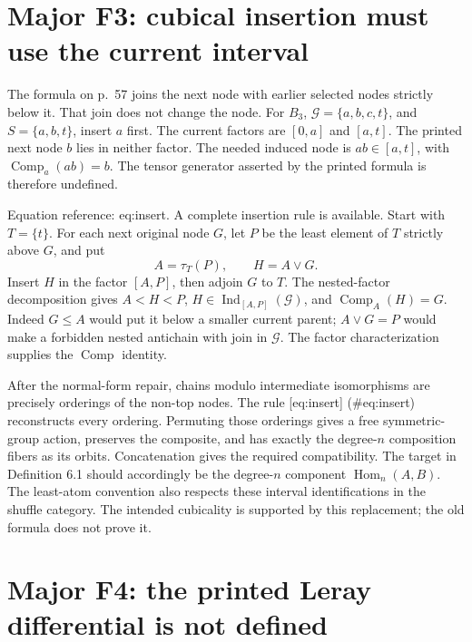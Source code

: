 \documentclass[10pt]{article}
\begin{document}
\section*{Major F3: cubical insertion must use the current interval}
The formula on p. 57 joins the next node with earlier selected nodes strictly below it. That join does not change the node. For \(B_3\), \(\mathcal G=\{a,b,c,t\}\), and \(S=\{a,b,t\}\), insert \(a\) first. The current factors are \([0,a]\) and \([a,t]\). The printed next node \(b\) lies in neither factor. The needed induced node is \(ab\in[a,t]\), with \(\operatorname{Comp}_a(ab)=b\). The tensor generator asserted by the printed formula is therefore undefined.\par
Equation reference: eq:insert. A complete insertion rule is available. Start with \(T=\{t\}\). For each next original node \(G\), let \(P\) be the least element of \(T\) strictly above \(G\), and put \[
 A=\tau_T(P),\qquad H=A\vee G.\] Insert \(H\) in the factor \([A,P]\), then adjoin \(G\) to \(T\). The nested-factor decomposition gives \(A<H<P\), \(H\in\operatorname{Ind}_{[A,P]}(\mathcal G)\), and \(\operatorname{Comp}_A(H)=G\). Indeed \(G\leq A\) would put it below a smaller current parent; \(A\vee G=P\) would make a forbidden nested antichain with join in \(\mathcal G\). The factor characterization supplies the \(\operatorname{Comp}\) identity.\par
After the normal-form repair, chains modulo intermediate isomorphisms are precisely orderings of the non-top nodes. The rule [eq:insert] (\#eq:insert) reconstructs every ordering. Permuting those orderings gives a free symmetric-group action, preserves the composite, and has exactly the degree-\(n\) composition fibers as its orbits. Concatenation gives the required compatibility. The target in Definition 6.1 should accordingly be the degree-\(n\) component \(\operatorname{Hom}_n(A,B)\). The least-atom convention also respects these interval identifications in the shuffle category. The intended cubicality is supported by this replacement; the old formula does not prove it.\par
\section*{Major F4: the printed Leray differential is not defined}
\end{document}
